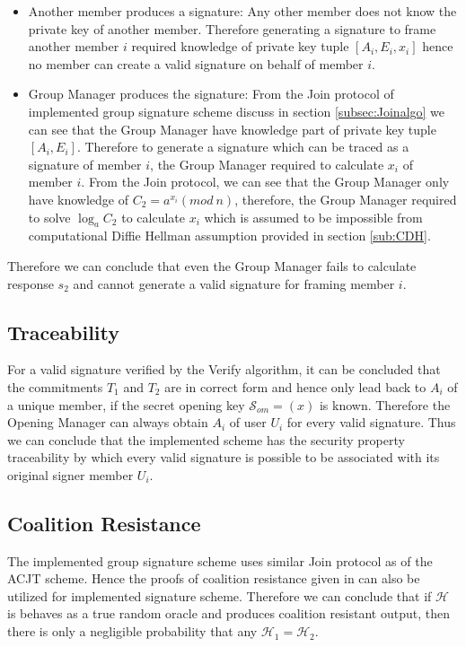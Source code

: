 \begin{itemize}
\item Another member produces a signature: Any other member does not know the private key of another member. Therefore generating a signature to frame another member $i$ required knowledge of private key tuple $[A_i, E_i, x_i]$ hence no member can create a valid signature on behalf of member $i$.
\item Group Manager produces the signature: From the Join protocol of implemented group signature scheme discuss in section \ref{subsec:Joinalgo} we can see that the Group Manager have knowledge part of private key tuple $[A_i, E_i]$. Therefore to generate a signature which can be traced as a signature of member $i$, the Group Manager required to calculate $x_i$ of member $i$. From the Join protocol, we can see that the Group Manager only have knowledge of $C_2 = a^{x_i}(mod~n)$, therefore, the Group Manager required to solve $\log_a C_2$ to calculate $x_i$ which is assumed to be impossible from computational Diffie Hellman assumption provided in section \ref{sub:CDH}. 
\end{itemize}
Therefore we can conclude that even the Group Manager fails to calculate response $s_2$ and cannot generate a valid signature for framing member $i$.

\subsection{Traceability}
For a valid signature verified by the Verify algorithm, it can be concluded that the commitments $T_1$ and $T_2$ are in correct form and hence only lead back to $A_i$ of a unique member, if the secret opening key $\mathcal{S}_{om} = (x)$ is known. Therefore the Opening Manager can always obtain $A_i$ of user $U_i$ for every valid signature. Thus we can conclude that the implemented scheme has the security property traceability by which every valid signature is possible to be associated with its original signer member $U_i$.

\subsection{Coalition Resistance}
The implemented group signature scheme uses similar Join protocol as of the ACJT scheme. Hence the proofs of coalition resistance given in \cite{ateniese2000practical} can also be utilized for implemented signature scheme. Therefore we can conclude that if $\mathcal{H}$ is behaves as a true random oracle and produces coalition resistant output, then there is only a negligible probability that any $\mathcal{H}_1 = \mathcal{H}_2$.

